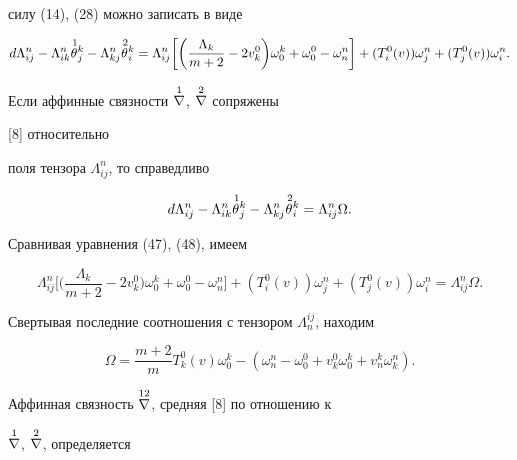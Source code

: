 силу (14), (28) можно записать в виде 


\begin{equation} 


d\Lambda^n_{ij}-\Lambda^n_{i k}\up{\,1}{\theta}^k_j- 


\Lambda^n_{k j}\up{\,2}{\theta}^k_i=\Lambda^n_{ij}\bigg[\bigg( 


\frac{\Lambda_k}{m+2}-2v^0_k\bigg)\omega^k_0+\omega^0_0- 


\omega^n_n\bigg]+(T^0_i(v))\omega^n_j+(T^0_j(v))\omega^n_i. 


\end{equation} 


 


Если аффинные связности $\overset{1}{\nabla}{}$, $\overset{2}{\nabla}{}$ сопряжены 


[8] относительно  


поля тензора $\Lambda^n_{ij}$, то справедливо 


\begin{equation} 


d\Lambda^n_{ij}-\Lambda^n_{i k}\up{\,1}{\theta}^k_j- 


\Lambda^n_{k j}\up{\,2}{\theta}^k_i=\Lambda^n_{ij}\Omega. 


\end{equation} 


Сравнивая уравнения (47), (48), имеем 


$$ 


\Lambda^n_{ij}\bigg[\bigg(\frac{\Lambda_k}{m+2}-2v^0_k\bigg) 


\omega^k_0+\omega^0_0-\omega^n_n\bigg]+(T^0_i(v)) 


\omega^n_j+(T^0_j(v))\omega^n_i=\Lambda^n_{ij}\Omega.


$$ 


Свертывая последние соотношения с тензором $\Lambda^{ij}_n$, находим 


\begin{equation} 


\Omega=\frac{m+2}{m}T^0_k(v)\omega^k_0-(\omega^n_n- 


\omega^0_0+v^0_k\omega^k_0+v^k_n\omega^n_k). 


\end{equation} 


 


Аффинная связность $\overset{12}{\nabla}{}$, средняя [8] по отношению к 


$\overset{1}{\nabla}{}$, $\overset{2}{\nabla}{}$, определяется 


